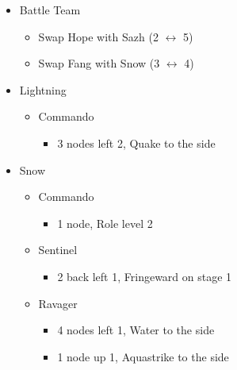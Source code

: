 \begin{menu}
\begin{multicols}{2}
\begin{itemize}
    \paradigm
    \begin{itemize}
        \item Battle Team
        \begin{itemize}
            \item Swap Hope with Sazh (2 $\leftrightarrow$ 5)
            \item Swap Fang with Snow (3 $\leftrightarrow$ 4)
        \end{itemize}
{\paradigmline[1]{\textit{\com}}{\textit{\syn}}{\textit{(\com)}}}%
{\paradigmline{(\rav)}{\rav}{\rav}}%
{\paradigmline{(\com)}{\syn}{\sen}}%
{\paradigmline{[\rav]}{(\rav)}{(\rav)}}%
{\paradigmline{\com}{[\com]}{\com}}%
{\paradigmline{\com}{[\com]}{\com}}
    \end{itemize}
    \crystarium
    \begin{itemize}
        \item Lightning
        \begin{itemize}
            \item Commando
            \begin{itemize}
                \item 3 nodes left 2, Quake to the side
            \end{itemize}
        \end{itemize}
        \item Snow
        \begin{itemize}
            \item Commando
            \begin{itemize}
                \item 1 node, Role level 2
            \end{itemize}
            \item Sentinel
            \begin{itemize}
                \item 2 back left 1, Fringeward on stage 1
            \end{itemize}
            \item Ravager
            \begin{itemize}
                \item 4 nodes left 1, Water to the side
                \item 1 node up 1, Aquastrike to the side

\end{itemize}
\end{itemize}
\end{itemize}
\end{itemize}
\end{multicols}
\end{menu}
